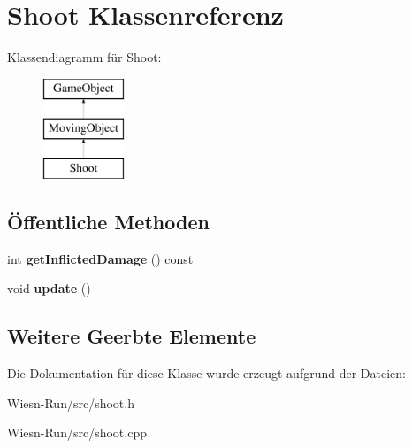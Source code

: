 \hypertarget{classShoot}{\section{Shoot Klassenreferenz}
\label{classShoot}
}
Klassendiagramm für Shoot\-:\begin{figure}[H]
\begin{center}
\leavevmode
\includegraphics[height=3.000000cm]{classShoot}
\end{center}
\end{figure}
\subsection*{Öffentliche Methoden}
\begin{DoxyCompactItemize}
\item 
\hypertarget{classShoot_a743efe2b8b84053510208ca04ef7638d}{int {\bfseries get\-Inflicted\-Damage} () const }\label{classShoot_a743efe2b8b84053510208ca04ef7638d}

\item 
\hypertarget{classShoot_a9d3509d5698be3d6e7e29f5483d988c7}{void {\bfseries update} ()}\label{classShoot_a9d3509d5698be3d6e7e29f5483d988c7}

\end{DoxyCompactItemize}
\subsection*{Weitere Geerbte Elemente}


Die Dokumentation für diese Klasse wurde erzeugt aufgrund der Dateien\-:\begin{DoxyCompactItemize}
\item 
Wiesn-\/\-Run/src/shoot.\-h\item 
Wiesn-\/\-Run/src/shoot.\-cpp\end{DoxyCompactItemize}
